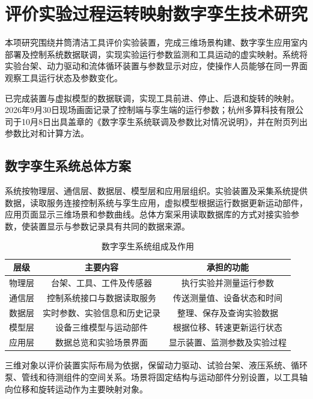 \chapter{评价实验过程运转映射数字孪生技术研究}
\label{chap:r46-6}

本项研究围绕井筒清洁工具评价实验装置，完成三维场景构建、数字孪生应用室内部署及控制系统数据联调，实现实验运行参数监测和工具运动的虚实映射。系统将实验台架、动力驱动和流体循环装置与参数显示对应，使操作人员能够在同一界面观察工具运行状态及参数变化。

已完成装置与虚拟模型的数据联调，实现工具前进、停止、后退和旋转的映射。2026年9月30日现场画面记录了控制端与孪生端的运行参数；杭州多算科技有限公司于10月8日出具盖章的《数字孪生系统联调及参数比对情况说明》，并在附页列出参数比对和计算方法。

\section{数字孪生系统总体方案}
\label{sec:r46-6.1}

系统按物理层、通信层、数据层、模型层和应用层组织。实验装置及采集系统提供数据，读取服务连接控制系统与孪生应用，虚拟模型根据运行数据更新运动部件，应用页面显示三维场景和参数曲线。总体方案采用读取数据库的方式对接实验参数，使装置显示与参数记录具有共同的数据来源。

\begin{table}[htbp]
	\centering
	\caption{数字孪生系统组成及作用}
	\label{tab:r46-6-1}
	\renewcommand{\arraystretch}{1.5}
	\begin{tabularx}{.9\textwidth}{CCC}
		\toprule
		层级 & 主要内容 & 承担的功能 \\
		\midrule
		物理层 & 台架、工具、工件及传感器 & 执行实验并测量运行参数 \\
		通信层 & 控制系统接口与数据读取服务 & 传送测量值、设备状态和时间 \\
		数据层 & 实时参数、实验信息和历史记录 & 整理、保存及查询实验数据 \\
		模型层 & 设备三维模型与运动部件 & 根据位移、转速更新运行状态 \\
		应用层 & 数据总览和实验场景界面 & 显示装置、监测参数及实验过程 \\
		\bottomrule
	\end{tabularx}
\end{table}

三维对象以评价装置实际布局为依据，保留动力驱动、试验台架、液压系统、循环泵、管线和待测组件的空间关系。场景将固定结构与运动部件分别设置，以工具轴向位移和旋转运动作为主要映射对象。

